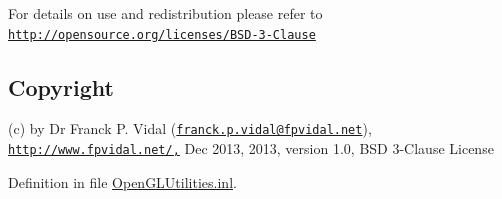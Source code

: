 For details on use and redistribution please refer to \href{http://opensource.org/licenses/BSD-3-Clause}{\tt http://opensource.org/licenses/BSD-\/3-\/Clause}\hypertarget{_x_ray_renderer_8inl_Copyright}{}\subsection{Copyright}\label{_x_ray_renderer_8inl_Copyright}
(c) by Dr Franck P. Vidal (\href{mailto:franck.p.vidal@fpvidal.net}{\tt franck.p.vidal@fpvidal.net}), \href{http://www.fpvidal.net/,}{\tt http://www.fpvidal.net/,} Dec 2013, 2013, version 1.0, BSD 3-\/Clause License 

Definition in file \hyperlink{_open_g_l_utilities_8inl_source}{OpenGLUtilities.inl}.

